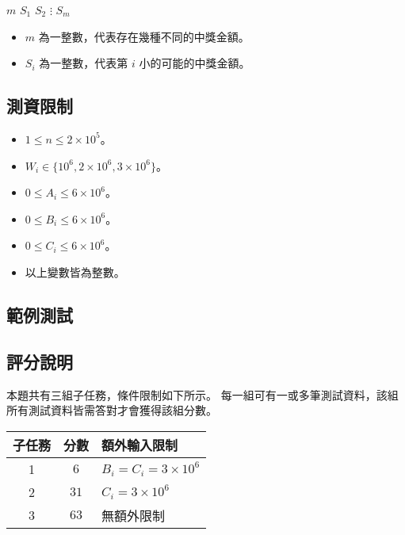\begin{format}
\f{
$m$
$S_1$
$S_2$
$\vdots$
$S_m$
}
\end{format}

\begin{itemize}
\tightlist
\item
  \(m\) 為一整數，代表存在幾種不同的中獎金額。
\item
  \(S_i\) 為一整數，代表第 \(i\) 小的可能的中獎金額。
\end{itemize}

\subsection{測資限制}

\begin{itemize}
\tightlist
\item
  \(1 \le n \le 2\times 10^5\)。
\item
  \(W_i \in \{10^6, 2\times 10^6, 3\times 10^6\}\)。
\item
  \(0\le A_i \le 6\times 10^6\)。
\item
  \(0\le B_i \le 6\times 10^6\)。
\item
  \(0\le C_i \le 6\times 10^6\)。
\item
  以上變數皆為整數。
\end{itemize}

\subsection{範例測試}

\begin{example}
%
%
%
\end{example}

\subsection{評分說明}

本題共有三組子任務，條件限制如下所示。
每一組可有一或多筆測試資料，該組所有測試資料皆需答對才會獲得該組分數。

\begin{longtable}[]{@{}ccl@{}}
\toprule
子任務 & 分數 & 額外輸入限制 \\
\midrule
\endhead
1 & \(6\) & \(B_i = C_i = 3\times 10^6\) \\
2 & \(31\) & \(C_i = 3\times 10^6\) \\
3 & \(63\) & 無額外限制 \\
\bottomrule
\end{longtable}

